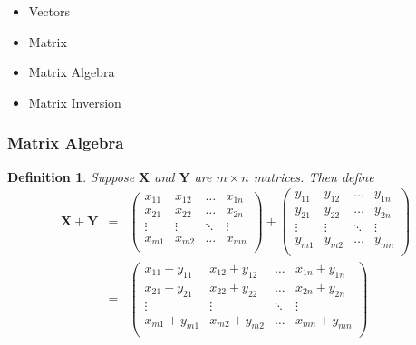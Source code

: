 \documentclass{beamer}
\newtheorem{defn}{Definition}
\numberwithin{equation}{section}
\begin{document}
\begin{frame}

\begin{itemize}
\item \textcolor{mygray}{Vectors}
\item \textcolor{mygray}{Matrix}
\item \textcolor{myblack}{Matrix Algebra}
\item \textcolor{mygray}{Matrix Inversion}
\end{itemize}

\end{frame}



\begin{frame}
\frametitle{Matrix Algebra}
\begin{defn} Suppose $\boldsymbol{X}$ and $\boldsymbol{Y} $ are $m \times n$ matrices.  Then define 
\begin{eqnarray} 
\boldsymbol{X} + \boldsymbol{Y} & = & \begin{pmatrix} 
x_{11} & x_{12} & \hdots & x_{1n} \\
x_{21} & x_{22} & \hdots & x_{2n} \\
\vdots & \vdots & \ddots & \vdots \\
x_{m1} & x_{m2} & \hdots & x_{mn} \\
\end{pmatrix} + 
\begin{pmatrix} 
y_{11} & y_{12} & \hdots & y_{1n} \\
y_{21} & y_{22} & \hdots & y_{2n} \\
\vdots & \vdots & \ddots & \vdots \\
y_{m1} & y_{m2} & \hdots & y_{mn} \\
\end{pmatrix}
\nonumber \\
& = & \begin{pmatrix} 
x_{11} + y_{11} & x_{12} + y_{12} & \hdots & x_{1n} + y_{1n} \\
x_{21} + y_{21} & x_{22} + y_{22} & \hdots & x_{2n} + y_{2n} \\
\vdots & \vdots & \ddots & \vdots\\
x_{m1} + y_{m1} & x_{m2} + y_{m2} & \hdots & x_{mn} + y_{mn} \\
\end{pmatrix} 
\nonumber 
\end{eqnarray}

\end{defn}

\end{frame}
\end{document}
